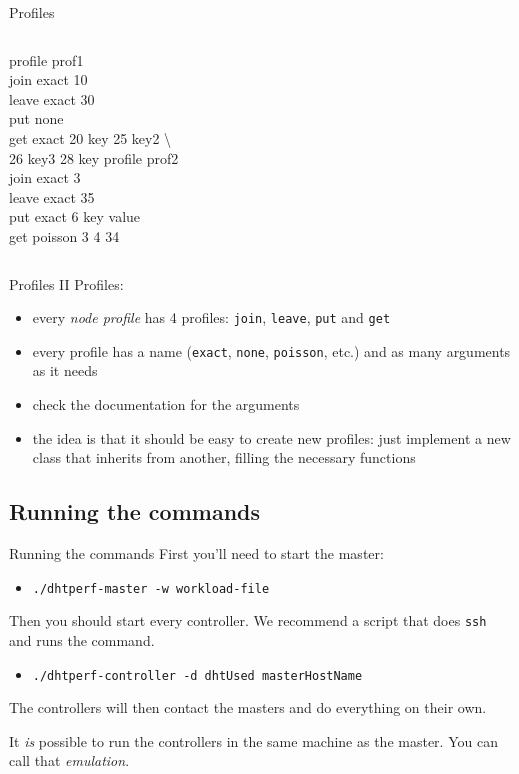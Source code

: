 \documentclass[compress]{beamer}
\begin{document}
\begin{frame}{Profiles}
\begin{columns}[c]
profile prof1\\
join exact 10\\
leave exact 30\\
put none\\
get exact 20 key 25 key2 \textbackslash \\
26 key3 28 key
profile prof2\\
join exact 3\\
leave exact 35\\
put exact 6 key value\\
get poisson 3 4 34\\
\end{columns}
\end{frame}

\begin{frame}{Profiles II}
Profiles:
\begin{itemize}
    \item every \emph{node profile} has 4 profiles: \texttt{join},
    \texttt{leave}, \texttt{put} and \texttt{get}
    \item every profile has a name (\texttt{exact}, \texttt{none},
    \texttt{poisson}, etc.) and as many arguments as it needs
    \item check the documentation for the arguments
    \item the idea is that it should be easy to create new profiles: just
    implement a new class that inherits from another, filling the necessary
    functions
\end{itemize}
\end{frame}

\subsection{Running the commands}

\begin{frame}{Running the commands}
First you'll need to start the master:
\begin{itemize}
    \item \texttt{./dhtperf-master -w workload-file}
\end{itemize}

Then you should start every controller. We recommend a script that does
\texttt{ssh} and runs the command.
\begin{itemize}
    \item \texttt{./dhtperf-controller -d dhtUsed masterHostName}
\end{itemize}

The controllers will then contact the masters and do everything on their own.

It \emph{is} possible to run the controllers in the same machine as the master.
You can call that \emph{emulation}.
\end{frame}
\end{document}
